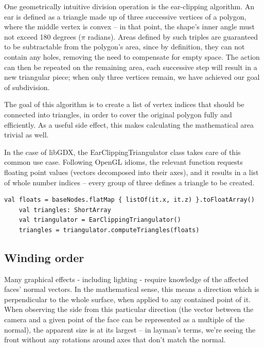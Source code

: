 One geometrically intuitive division operation is the ear-clipping algorithm. An ear is defined as a triangle made up of three successive vertices of a polygon, where the middle vertex is convex -- in that point, the shape's inner angle must not exceed 180 degrees ($\pi$ radians).\cite{TriangulationByEarClipping} Areas defined by such triples are guaranteed to be subtractable from the polygon's area, since by definition, they can not contain any holes, removing the need to compensate for empty space. The action can then be repeated on the remaining area, each successive step will result in a new triangular piece; when only three vertices remain, we have achieved our goal of subdivision.

The goal of this algorithm is to create a list of vertex indices that should be connected into triangles, in order to cover the original polygon fully and efficiently. As a useful side effect, this makes calculating the mathematical area trivial as well.

In the case of libGDX, the EarClippingTriangulator class takes care of this common use case. Following OpenGL idioms, the relevant function requests floating point values (vectors decomposed into their axes), and it results in a list of whole number indices -- every group of three defines a triangle to be created.

\begin{lstlisting}[caption=Example usage of the EarClippingTriangulator class]
    val floats = baseNodes.flatMap { listOf(it.x, it.z) }.toFloatArray()
    val triangles: ShortArray
    val triangulator = EarClippingTriangulator()
    triangles = triangulator.computeTriangles(floats)
\end{lstlisting}

\subsection{Winding order}

Many graphical effects - including lighting - require knowledge of the affected faces' normal vectors. In the mathematical sense, this means a direction which is perpendicular to the whole surface, when applied to any contained point of it. %
When observing the side from this particular direction (the vector between the camera and a given point of the face can be represented as a multiple of the normal), the apparent size is at its largest -- in layman's terms, we're seeing the front without any rotations around axes that don't match the normal.

